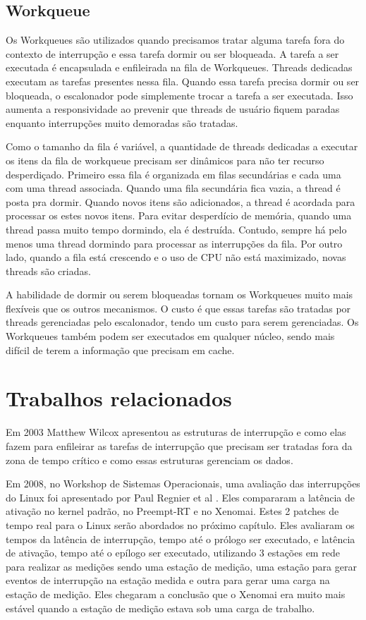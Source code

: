 \subsection{Workqueue}

Os Workqueues são utilizados quando precisamos tratar alguma tarefa fora do contexto de interrupção e essa tarefa dormir ou ser bloqueada. A tarefa a ser executada é encapsulada e enfileirada na fila de Workqueues. Threads dedicadas executam as tarefas presentes nessa fila. Quando essa tarefa precisa dormir ou ser bloqueada, o escalonador pode simplemente trocar a tarefa a ser executada. Isso aumenta a responsividade ao prevenir que threads de usuário fiquem paradas enquanto interrupções muito demoradas são tratadas.

Como o tamanho da fila é variável, a quantidade de threads dedicadas a executar os itens da fila de workqueue precisam ser dinâmicos para não ter recurso desperdiçado. Primeiro essa fila é organizada em filas secundárias e cada uma com uma thread associada. Quando uma fila secundária fica vazia, a thread é posta pra dormir. Quando novos itens são adicionados, a thread é acordada para processar os estes novos itens. Para evitar desperdício de memória, quando uma thread passa muito tempo dormindo, ela é destruída. Contudo, sempre há pelo menos uma thread dormindo para processar as interrupções da fila. Por outro lado, quando a fila está crescendo e o uso de CPU não está maximizado, novas threads são criadas.

A habilidade de dormir ou serem bloqueadas tornam os Workqueues muito mais flexíveis que os outros mecanismos. O custo é que essas tarefas são tratadas por threads gerenciadas pelo escalonador, tendo um custo para serem gerenciadas. Os Workqueues também podem ser executados em qualquer núcleo, sendo mais difícil de terem a informação que precisam em cache.

\section{Trabalhos relacionados}

Em 2003 Matthew Wilcox \cite{Wilcox2003} apresentou as estruturas de interrupção e como elas fazem para enfileirar as tarefas de interrupção que precisam ser tratadas fora da zona de tempo crítico e como essas estruturas gerenciam os dados.

Em 2008, no Workshop de Sistemas Operacionais, uma avaliação das interrupções do Linux foi apresentado por Paul Regnier et al \cite{Regnier2008}. Eles compararam a latência de ativação no kernel padrão, no Preempt-RT e no Xenomai. Estes 2 patches de tempo real para o Linux serão abordados no próximo capítulo. Eles avaliaram os tempos da latência de interrupção, tempo até o prólogo ser executado, e latência de ativação, tempo até o epílogo ser executado, utilizando 3 estações em rede para realizar as medições sendo uma estação de medição, uma estação para gerar eventos de interrupção na estação medida e outra para gerar uma carga na estação de medição. Eles chegaram a conclusão que o Xenomai era muito mais estável quando a estação de medição estava sob uma carga de trabalho.

